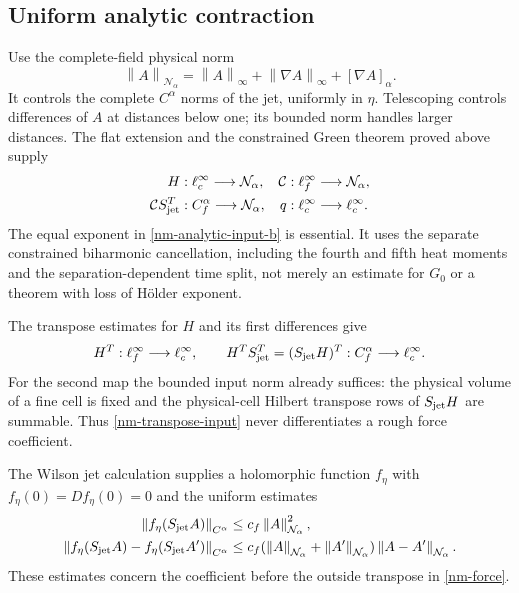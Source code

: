 \documentclass[11pt]{article}
\theoremstyle{remark}\newtheorem{remark}[theorem]{Remark}
\newcommand{\norm}[1]{\left\lVert#1\right\rVert}
\begin{document}
\subsection{Uniform analytic contraction}
\label{nm-contraction}

Use the complete-field physical norm
\begin{equation}\label{nm-norm}
 \norm{A}_{\mathcal N_\alpha}
 =\norm{A}_\infty+\norm{\nabla A}_\infty+[\nabla A]_\alpha.
\end{equation}
It controls the complete $C^\alpha$ norms of the jet, uniformly in
$\eta$. Telescoping controls differences of $A$ at distances below
one; its bounded norm handles larger distances. The flat extension
and the constrained Green theorem proved above supply
\begin{align}
 H &: \ell^\infty_c\longrightarrow\mathcal N_\alpha,&
 \mathcal C &: \ell^\infty_f\longrightarrow\mathcal N_\alpha,
                                                        \label{nm-analytic-input-a}\\
 \mathcal C S_{\rm jet}^T &: C^\alpha_f\longrightarrow\mathcal N_\alpha,
 &q &: \ell^\infty_c\longrightarrow\ell^\infty_c.
                                                        \label{nm-analytic-input-b}
\end{align}
The equal exponent in \eqref{nm-analytic-input-b} is essential.
It uses the separate constrained biharmonic cancellation, including
the fourth and fifth heat moments and the separation-dependent
time split, not merely an estimate for $G_0$ or a theorem with
loss of H\"older exponent.

The transpose estimates for $H$ and its first differences give
\begin{equation}\label{nm-transpose-input}
 H^T:\ell^\infty_f\longrightarrow\ell^\infty_c,
 \qquad H^TS_{\rm jet}^T=(S_{\rm jet}H)^T:
       C^\alpha_f\longrightarrow\ell^\infty_c.
\end{equation}
For the second map the bounded input norm already suffices:
the physical volume of a fine cell is fixed and the physical-cell
Hilbert transpose rows of $S_{\rm jet}H$ are summable. Thus
\eqref{nm-transpose-input} never differentiates a rough force
coefficient.

The Wilson jet calculation supplies a holomorphic function
$f_\eta$ with $f_\eta(0)=Df_\eta(0)=0$ and the uniform estimates
\begin{align}
 \norm{f_\eta(S_{\rm jet}A)}_{C^\alpha}
 &\le c_f\norm{A}_{\mathcal N_\alpha}^2,                 \label{nm-force-bound}\\
 \norm{f_\eta(S_{\rm jet}A)-f_\eta(S_{\rm jet}A')}_{C^\alpha}
 &\le c_f(\norm{A}_{\mathcal N_\alpha}+
           \norm{A'}_{\mathcal N_\alpha})
                 \norm{A-A'}_{\mathcal N_\alpha}.        \label{nm-force-lipschitz}
\end{align}
These estimates concern the coefficient before the outside
transpose in \eqref{nm-force}.
\end{document}
